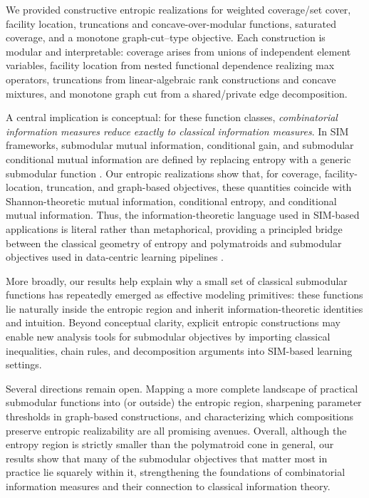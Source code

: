 \documentclass[conference]{IEEEtran}
\theoremstyle{definition}
\theoremstyle{remark}
\begin{document}
We provided constructive entropic realizations for weighted coverage/set cover, facility location, truncations and concave-over-modular functions, saturated coverage, and a monotone graph-cut–type objective.
Each construction is modular and interpretable: coverage arises from unions of independent element variables, facility location from nested functional dependence realizing max operators, truncations from linear-algebraic rank constructions and concave mixtures, and monotone graph cut from a shared/private edge decomposition.

A central implication is conceptual: for these function classes, \emph{combinatorial information measures reduce exactly to classical information measures}.
In SIM frameworks, submodular mutual information, conditional gain, and submodular conditional mutual information are defined by replacing entropy with a generic submodular function \cite{iyer2021generalized,iyer2021submodular,asnani2021independence}.
Our entropic realizations show that, for coverage, facility-location, truncation, and graph-based objectives, these quantities coincide with Shannon-theoretic mutual information, conditional entropy, and conditional mutual information.
Thus, the information-theoretic language used in SIM-based applications is literal rather than metaphorical, providing a principled bridge between the classical geometry of entropy and polymatroids \cite{Yeung2008,ZhangYeung1998} and submodular objectives used in data-centric learning pipelines \cite{kothawade2021similar,kothawade2022prism,karanam2022orient,li2022platinum,majee2024score,beck2024theoretical}.

More broadly, our results help explain why a small set of classical submodular functions has repeatedly emerged as effective modeling primitives: these functions lie naturally inside the entropic region and inherit information-theoretic identities and intuition.
Beyond conceptual clarity, explicit entropic constructions may enable new analysis tools for submodular objectives by importing classical inequalities, chain rules, and decomposition arguments into SIM-based learning settings.

Several directions remain open.
Mapping a more complete landscape of practical submodular functions into (or outside) the entropic region, sharpening parameter thresholds in graph-based constructions, and characterizing which compositions preserve entropic realizability are all promising avenues.
Overall, although the entropy region is strictly smaller than the polymatroid cone in general, our results show that many of the submodular objectives that matter most in practice lie squarely within it, strengthening the foundations of combinatorial information measures and their connection to classical information theory.



\end{document}
